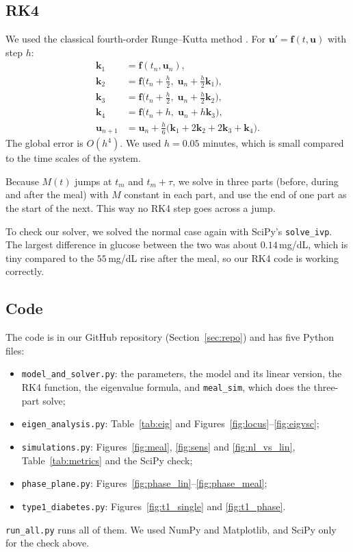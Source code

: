 \documentclass[11pt,a4paper]{article}
\begin{document}
\subsection{RK4}
We used the classical fourth-order Runge--Kutta method \cite{boyce}. For $\mathbf{u}'=\mathbf{f}(t,\mathbf{u})$ with step $h$:
\begin{align}
\mathbf{k}_1 &= \mathbf{f}(t_n,\mathbf{u}_n),\\
\mathbf{k}_2 &= \mathbf{f}\bigl(t_n+\tfrac h2,\;\mathbf{u}_n+\tfrac h2\mathbf{k}_1\bigr),\\
\mathbf{k}_3 &= \mathbf{f}\bigl(t_n+\tfrac h2,\;\mathbf{u}_n+\tfrac h2\mathbf{k}_2\bigr),\\
\mathbf{k}_4 &= \mathbf{f}\bigl(t_n+h,\;\mathbf{u}_n+h\mathbf{k}_3\bigr),\\
\mathbf{u}_{n+1} &= \mathbf{u}_n+\frac h6\bigl(\mathbf{k}_1+2\mathbf{k}_2+2\mathbf{k}_3+\mathbf{k}_4\bigr).
\end{align}
The global error is $O(h^4)$. We used $h=0.05$ minutes, which is small compared to the time scales of the system.

Because $M(t)$ jumps at $t_m$ and $t_m+\tau$, we solve in three parts (before, during and after the meal) with $M$ constant in each part, and use the end of one part as the start of the next. This way no RK4 step goes across a jump.

To check our solver, we solved the normal case again with SciPy's \texttt{solve\_ivp}. The largest difference in glucose between the two was about $0.14$\,mg/dL, which is tiny compared to the $55$\,mg/dL rise after the meal, so our RK4 code is working correctly.

\subsection{Code}
The code is in our GitHub repository (Section~\ref{sec:repo}) and has five Python files:
\begin{itemize}
\item \texttt{model\_and\_solver.py}: the parameters, the model and its linear version, the RK4 function, the eigenvalue formula, and \texttt{meal\_sim}, which does the three-part solve;
\item \texttt{eigen\_analysis.py}: Table~\ref{tab:eig} and Figures~\ref{fig:locus}--\ref{fig:eigvsc};
\item \texttt{simulations.py}: Figures~\ref{fig:meal}, \ref{fig:sens} and \ref{fig:nl_vs_lin}, Table~\ref{tab:metrics} and the SciPy check;
\item \texttt{phase\_plane.py}: Figures~\ref{fig:phase_lin}--\ref{fig:phase_meal};
\item \texttt{type1\_diabetes.py}: Figures~\ref{fig:t1_single} and \ref{fig:t1_phase}.
\end{itemize}
\texttt{run\_all.py} runs all of them. We used NumPy and Matplotlib, and SciPy only for the check above.
\end{document}
